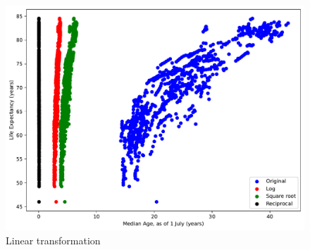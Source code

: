 \documentclass[a4paper]{article}
\begin{document}
\begin{figure}[H]
  \begin{center}
    \includegraphics[width=\textwidth]{ola/linear_transformation.pdf}
    \caption{Linear transformation}
    \label{fig:linear_transformation}
  \end{center}
\end{figure}
\end{document}

